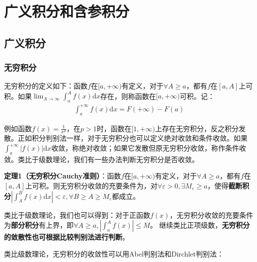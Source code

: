 \documentclass{ctexart}
\let\oldtextbf\textbf
\renewcommand{\textbf}[1]{\textcolor{brown!50!red}{\oldtextbf{#1}}}
\begin{document}
\section{广义积分和含参积分}
\subsection{广义积分}
\subsubsection{无穷积分}
无穷积分的定义如下：函数$f$在$[a,+\infty)$有定义，对于$\forall A\geq a$，都有$f$在$[a,A]$上可积。如果$\lim_{A\to\infty}\int_a^A f(x)\mathrm{d}x$存在，则称函数在$[a,+\infty)$可积。记：
\begin{align*}
    \int_a^{+\infty}f(x)\mathrm{d}x=F(+\infty)-F(a)
\end{align*}

例如函数$f(x)=\frac{1}{x^p}$，在$p>1$时，函数在$[1,+\infty)$上存在无穷积分，反之积分发散。正如积分判别法一样，对于无穷积分也可以定义绝对收敛和条件收敛。如果$\int_a^{+\infty}|f(x)|\mathrm{d}x$收敛，称绝对收敛；如果它发散但原无穷积分收敛，称作条件收敛。类比于级数理论，我们有一些办法判断无穷积分是否收敛。
\begin{tcolorbox}[
    colback=bac2,     %
    colframe=fra2,   %
    coltitle=white,             %
    coltext=tex2,
    title=无穷积分Cauchy准则,
    fonttitle=\bfseries,        %
arc=3mm,                     %
breakable
]
\textbf{\color{brown!50!red}定理1（无穷积分Cauchy准则）}：函数$f$在$[a,+\infty)$有定义，对于$\forall A\geq a$，都有$f$在$[a,A]$上可积。则无穷积分收敛的充要条件为，对$\forall \varepsilon>0,\exists M_\varepsilon\geq a$，使得\textbf{\color{brown!50!red}截断积分}$|\int_A^B f(x)\mathrm{d}x|<\varepsilon,\forall B\geq A\geq M_\varepsilon$都成立。
\end{tcolorbox}

类比于级数理论，我们也可以得到：对于正函数$f(x)$，无穷积分收敛的充要条件为\textbf{\color{brown!50!red}部分积分}有上界，即$\forall A\geq a,|\int_a^A f(x)|\leq M$。
继续类比正项级数，\textbf{\color{brown!50!red}无穷积分的敛散性也可根据比较判别法进行判断}。

类比级数理论，无穷积分的收敛性可以用Abel判别法和Dirchlet判别法：
\end{document}
